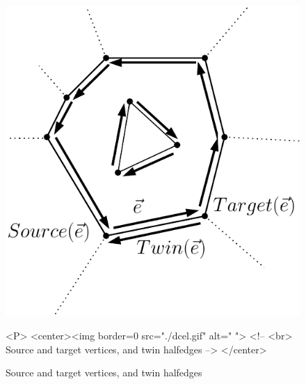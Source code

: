 \begin{figure}
\begin{ccTexOnly}
    \centerline{
       \includegraphics{Topological_map/dcel}
       }
\end{ccTexOnly}
\caption{Source and target vertices, and twin halfedges \label{fig:DCEL}}

\begin{ccHtmlOnly}
<P>
<center><img border=0 src="./dcel.gif" alt=" ">
<!-- <br> Source and target vertices, and twin halfedges -->
</center>
\end{ccHtmlOnly}
\end{figure}

